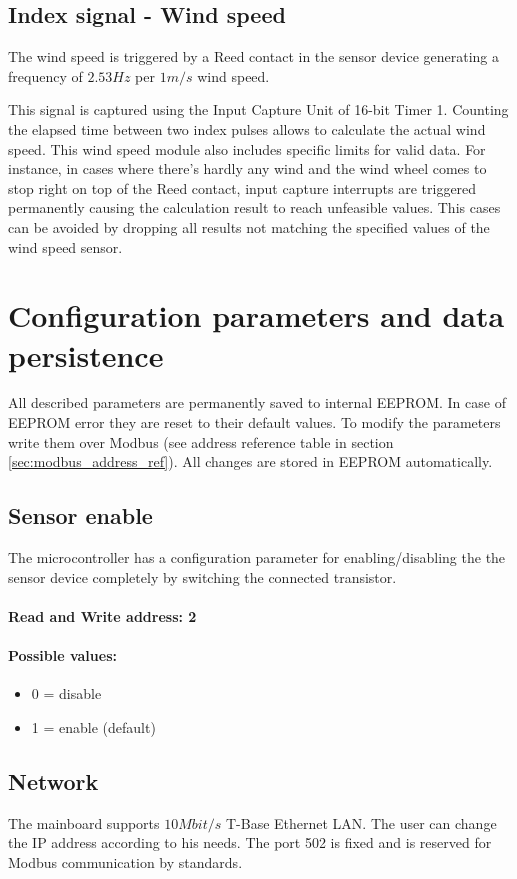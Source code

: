 \subsection{Index signal - Wind speed}
The wind speed is triggered by a Reed contact in the sensor device generating a frequency of $2.53 Hz$ per $1 m/s$ wind speed.

This signal is captured using the Input Capture Unit of 16-bit Timer 1. Counting the elapsed time between two index pulses allows to calculate the actual wind speed. This wind speed module also includes specific limits for valid data. For instance, in cases where there's hardly any wind and the wind wheel comes to stop right on top of the Reed contact, input capture interrupts are triggered permanently causing the calculation result to reach unfeasible values. This cases can be avoided by dropping all results not matching the specified values of the wind speed sensor.

\section{Configuration parameters and data persistence}
All described parameters are permanently saved to internal EEPROM. In case of EEPROM error they are reset to their default values. To modify the parameters write them over Modbus (see address reference table in section \ref{sec:modbus_address_ref}). All changes are stored in EEPROM automatically.

\subsection{Sensor enable}
The microcontroller has a configuration parameter for enabling/disabling the the sensor device completely by switching the connected transistor. 

\paragraph{Read and Write address: 2}
\paragraph{Possible values:}
\begin{itemize}
    \item 0 = disable
    \item 1 = enable (default)
\end{itemize}

\subsection{Network}
The mainboard supports $10 Mbit/s$ T-Base Ethernet LAN. The user can change the IP address according to his needs. The port 502 is fixed and is reserved for Modbus communication by standards.

